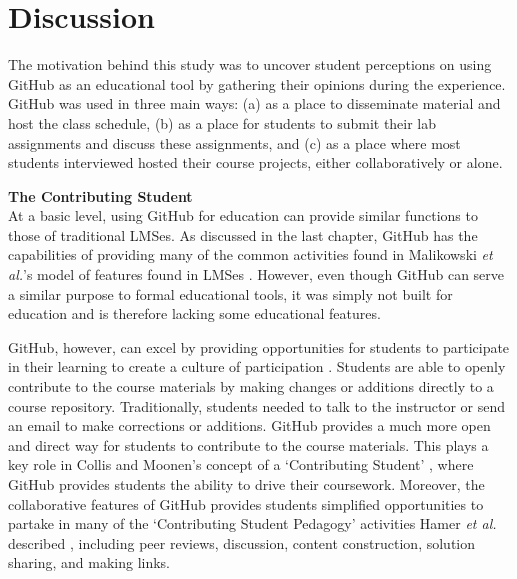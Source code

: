 \section{Discussion}
The motivation behind this study was to uncover student perceptions on using GitHub as an educational tool by gathering their opinions during the experience. GitHub was used in three main ways: (a) as a place to disseminate material and host the class schedule, (b) as a place for students to submit their lab assignments and discuss these assignments, and (c) as a place where most students interviewed hosted their course projects, either collaboratively or alone.




\textbf{The Contributing Student} \\
At a basic level, using GitHub for education can provide similar functions to those of traditional LMSes. As discussed in the last chapter, GitHub has the capabilities of providing many of the common activities found in Malikowski \textit{et al.}'s model of features found in LMSes \cite{malikowski2007model}. However, even though GitHub can serve a similar purpose to formal educational tools, it was simply not built for education and is therefore lacking some educational features.

GitHub, however, can excel by providing opportunities for students to participate in their learning to create a culture of participation \cite{jenkins2009confronting}. Students are able to openly contribute to the course materials by making changes or additions directly to a course repository. Traditionally, students needed to talk to the instructor or send an email to make corrections or additions. GitHub provides a much more open and direct way for students to contribute to the course materials. This plays a key role in Collis and Moonen's concept of a `Contributing Student' \cite{collis2006contributing}, where GitHub provides students the ability to drive their coursework. Moreover, the collaborative features of GitHub provides students simplified opportunities to partake in many of the `Contributing Student Pedagogy' activities Hamer \textit{et al.} described \cite{hamer2011tools}, including peer reviews, discussion, content construction, solution sharing, and making links.

